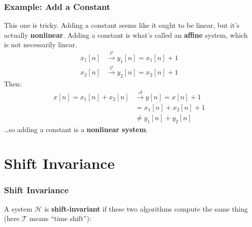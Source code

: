 \documentclass{beamer}
\begin{document}
\begin{frame}
  \frametitle{Example: Add a Constant}

  This one is tricky.  Adding a constant seems like it ought to be
  linear, but it's actually {\bf nonlinear}. Adding a constant is
  what's called an {\bf affine} system, which is not necessarily linear.
  \begin{align*}
  x_1[n] &\stackrel{\mathcal C}{\longrightarrow} y_1[n]=x_1[n]+1\\
  x_2[n] &\stackrel{\mathcal C}{\longrightarrow} y_2[n]=x_2[n]+1
  \end{align*}
  Then:
  \begin{align*}
    x[n]=x_1[n]+x_2[n] &\stackrel{\mathcal A}{\longrightarrow} y[n]=x[n]+1\\
    &= x_1[n]+x_2[n]+1\\
    &\ne y_1[n]+y_2[n]
  \end{align*}
  \ldots so adding a constant is a {\bf nonlinear system}.
\end{frame}


\section[Shift Invariance]{Shift Invariance}
\setcounter{subsection}{1}

\begin{frame}
  \frametitle{Shift Invariance}

  A system ${\mathcal H}$ is {\bf shift-invariant} if these two
  algorithms compute the same thing (here ${\mathcal T}$ means ``time
  shift''):
  
  \begin{center}
  \end{center}
  \begin{center}
  \end{center}
\end{frame}
\end{document}
